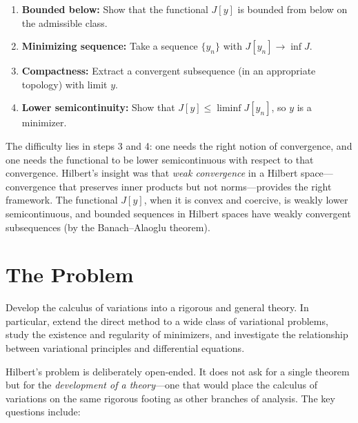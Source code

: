 \begin{enumerate}
    \item \textbf{Bounded below:} Show that the functional $J[y]$ is bounded from below on the admissible class.
    \item \textbf{Minimizing sequence:} Take a sequence $\{y_n\}$ with $J[y_n] \to \inf J$.
    \item \textbf{Compactness:} Extract a convergent subsequence (in an appropriate topology) with limit $y$.
    \item \textbf{Lower semicontinuity:} Show that $J[y] \leq \liminf J[y_n]$, so $y$ is a minimizer.
\end{enumerate}

The difficulty lies in steps 3 and 4: one needs the right notion of convergence, and one needs the functional to be lower semicontinuous with respect to that convergence. Hilbert's insight was that \emph{weak convergence} in a Hilbert space---convergence that preserves inner products but not norms---provides the right framework. The functional $J[y]$, when it is convex and coercive, is weakly lower semicontinuous, and bounded sequences in Hilbert spaces have weakly convergent subsequences (by the Banach--Alaoglu theorem).

\section{The Problem}

\begin{problem_statement}
Develop the calculus of variations into a rigorous and general theory. In particular, extend the direct method to a wide class of variational problems, study the existence and regularity of minimizers, and investigate the relationship between variational principles and differential equations.
\end{problem_statement}

Hilbert's problem is deliberately open-ended. It does not ask for a single theorem but for the \emph{development of a theory}---one that would place the calculus of variations on the same rigorous footing as other branches of analysis. The key questions include:

